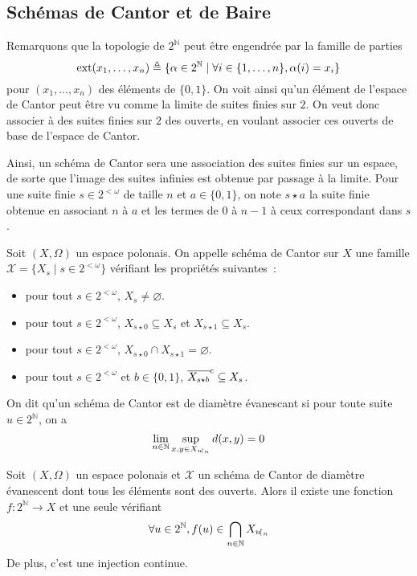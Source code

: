 \subsection{Schémas de Cantor et de Baire}

Remarquons que la topologie de $2^{\mathbb N}$ peut être engendrée par la famille
de parties
\[\operatorname{ext}(x_1,\ldots,x_n) \triangleq
\{\alpha \in 2^{\mathbb N}\mid \forall i \in \{1,\ldots,n\}, \alpha(i) = x_i\}\]
pour $(x_1,\ldots,x_n)$ des éléments de $\{0,1\}$. On voit ainsi qu'un élément
de l'espace de Cantor peut être vu comme la limite de suites finies sur $2$.
On veut donc associer à des suites finies sur $2$ des ouverts, en voulant
associer ces ouverts de base de l'espace de Cantor.

Ainsi, un schéma de Cantor sera une association des suites finies sur un espace,
de sorte que l'image des suites infinies est obtenue par passage à la limite.
Pour une suite finie $s \in 2^{<\omega}$ de taille $n$ et $a \in \{0,1\}$, on
note $s\star a$ la suite finie obtenue en associant $n$ à $a$ et les termes
de $0$ à $n-1$ à ceux correspondant dans $s$.

\begin{definition}
  Soit $(X,\Omega)$ un espace polonais. On appelle schéma de Cantor sur $X$ une
  famille $\mathcal X = \{X_s\mid s \in 2^{<\omega}\}$ vérifiant les propriétés
  suivantes~:
  \begin{itemize}
  \item pour tout $s \in 2^{<\omega}$, $X_s \neq \varnothing$.
  \item pour tout $s\in 2^{<\omega}$, $X_{s\star 0} \subseteq X_s$ et
    $X_{s\star 1} \subseteq X_s$.
  \item pour tout $s\in 2^{<\omega}$,
    $X_{s\star 0}\cap X_{s\star 1} = \varnothing$.
  \item pour tout $s \in 2^{<\omega}$ et $b \in \{0,1\}$,
    $\overline{X_{s\star b}}^{\mathrm c}\subseteq X_s$.
  \end{itemize}

  On dit qu'un schéma de Cantor est de diamètre évanescant si pour toute suite
  $u\in 2^{\mathbb N}$, on a
  \[\lim_{n\in\mathbb N} \sup_{x,y\in X_{u\!\upharpoonright_{n}}}d(x,y) = 0\]
\end{definition}

\begin{proposition}\label{desc.prop.schem.C}
  Soit $(X,\Omega)$ un espace polonais et $\mathcal X$ un schéma de Cantor de
  diamètre évanescent dont tous les éléments sont des ouverts. Alors il existe
  une fonction $f : 2^{\mathbb N} \to X$ et une seule vérifiant
  \[\forall u \in 2^{\mathbb N}, f(u) \in \bigcap_{n \in \mathbb N}X_{u\!\upharpoonright_{n}}\]
  De plus, c'est une injection continue.
\end{proposition}

